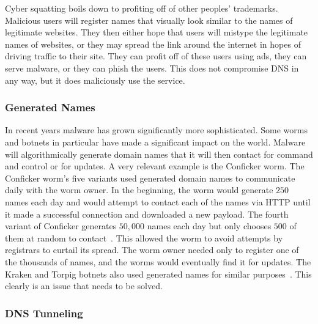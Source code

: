 Cyber squatting boils down to profiting off of other peoples' trademarks.
Malicious users will register names that visually look similar to the names of legitimate websites.
They then either hope that users will mistype the legitimate names of websites, or they may spread
the link around the internet in hopes of driving traffic to their site.
They can profit off of these users using ads, they can serve malware, or they can phish the users.
This does not compromise DNS in any way, but it does maliciously use the service.

\subsubsection{Generated Names}

In recent years malware has grown significantly more sophisticated.
Some worms and botnets in particular have made a significant impact on the world.
Malware will algorithmically generate domain names that it will then contact for command and control
or for updates.
A very relevant example is the Conficker worm.
The Conficker worm's five variants used generated domain names to communicate daily with the worm
owner.
In the beginning, the worm would generate $250$ names each day and would attempt to contact each of
the names via HTTP until it made a successful connection and downloaded a new payload.
The fourth variant of Conficker generates $50,000$ names each day but only chooses $500$ of them
at random to contact~\cite{conficker}.
This allowed the worm to avoid attempts by registrars to curtail its spread.
The worm owner needed only to register one of the thousands of names, and the worms would eventually
find it for updates.
The Kraken and Torpig botnets also used generated names for similar purposes~\cite{algorithm}.
This clearly is an issue that needs to be solved.

\subsubsection{DNS Tunneling}

